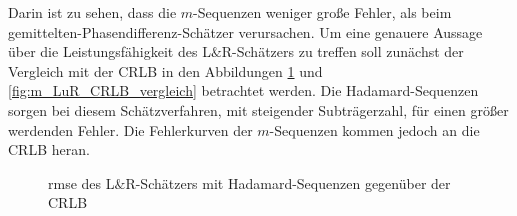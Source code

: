 Darin ist zu sehen, dass die $m$-Sequenzen weniger große Fehler, als beim gemittelten-Phasendifferenz-Schätzer verursachen. Um eine genauere Aussage über die Leistungsfähigkeit des L$\&$R-Schätzers zu treffen soll zunächst der Vergleich mit der \gls{CRLB} in den Abbildungen \ref{fig:Had_LuR_CRLB_vergleich} und \ref{fig:m_LuR_CRLB_vergleich} betrachtet werden. 
Die Hadamard-Sequenzen sorgen bei diesem Schätzverfahren, mit steigender Subträgerzahl, für einen größer werdenden Fehler. Die Fehlerkurven der $m$-Sequenzen kommen jedoch an die \gls{CRLB} heran.

\begin{figure}[htbp]
	\centering
		
	
	\caption{\gls{rmse} des L$\&$R-Schätzers mit Hadamard-Sequenzen gegenüber der \gls{CRLB}}
	\label{fig:Had_LuR_CRLB_vergleich}	
\end{figure}

